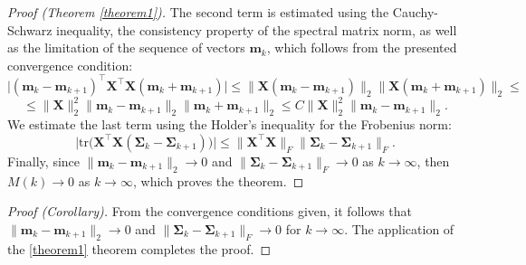 \documentclass[
11pt,%
tightenlines,%
twoside,%
onecolumn,%
nofloats,%
nobibnotes,%
nofootinbib,%
superscriptaddress,%
noshowpacs,%
centertags]%
{revtex4-2}
\begin{document}
\begin{proof}[Proof (Theorem \ref{theorem1})]
    The second term is estimated using the Cauchy-Schwarz inequality, the consistency property of the spectral matrix norm, as well as the limitation of the sequence of vectors $\mathbf{m}_k$, which follows from the presented convergence condition:
\[\big| (\mathbf{m}_k - \mathbf{m}_{k+1})^{\top} \mathbf{X}^{\top}\mathbf{X} (\mathbf{m}_k + \mathbf{m}_{k+1}) \big| \leqslant \| \mathbf{X} (\mathbf{m}_k - \mathbf{m}_{k+1}) \|_2 \| \mathbf{X} (\mathbf{m}_k + \mathbf{m}_{k+1}) \|_2 \leqslant \]
    \[ \leqslant \| \mathbf{X} \|_2^2 \| \mathbf{m}_k - \mathbf{m}_{k+1} \|_2 \| \mathbf{m}_k + \mathbf{m}_{k+1} \|_2 \leqslant C \| \mathbf{X} \|_2^2 \| \mathbf{m}_k - \mathbf{m}_{k+1} \|_2. \]
    We estimate the last term using the Holder's inequality for the Frobenius norm:
    \[ \Big| \text{tr} \Big( \mathbf{X}^{\top}\mathbf{X} \left( \mathbf{\Sigma}_k - \mathbf{\Sigma}_{k+1} \right) \Big) \Big| \leqslant \| \mathbf{X}^{\top}\mathbf{X} \|_F \| \mathbf{\Sigma}_k - \mathbf{\Sigma}_{k+1} \|_F. \]
Finally, since $\|\mathbf{m}_k - \mathbf{m}_{k+1} \|_2\to 0$ and $\|\mathbf{\Sigma}_k - \mathbf{\Sigma}_{k+1}\|_{F}\to 0$ as $k\to\infty$, then $M(k)\to 0$ as $k\to \infty$, which proves the theorem.
\end{proof}

\begin{proof}[Proof (Corollary)]
    From the convergence conditions given, it follows that $\|\mathbf{m}_k - \mathbf{m}_{k+1} \|_2\to 0$ and $\|\mathbf{\Sigma}_k -\mathbf{\Sigma}_{k+1}\|_{F}\to 0$ for $k\to \infty$. The application of the \ref{theorem1} theorem completes the proof.
\end{proof}

%
%
\end{document}

